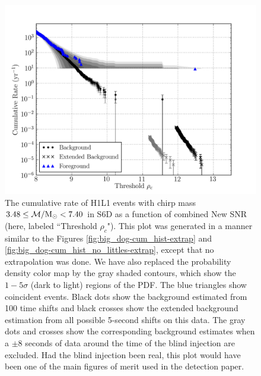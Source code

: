 \begin{figure}[p]
\center
\includegraphics[width=6in]{figures/big_dog/H1L1V1-lalapps_cbc_plotrates_FINAL_PLOT_cumulative_F1_ALL_DATA_PLOTTED_OPEN_BOX-961545543-10076544.png}
\caption{The cumulative rate of H1L1 events with chirp mass $3.48 \le \mathcal{M}/\mathrm{M_\odot}
< 7.40$ in S6D as a function of combined New SNR (here, labeled
``Threshold $\rho_c$"). This plot was generated in a manner similar to the
Figures \ref{fig:big_dog-cum_hist-extrap} and
\ref{fig:big_dog-cum_hist_no_littles-extrap}, except that no extrapolation was
done. We have also replaced the probability density color map by the gray
shaded contours, which show the $1 - 5\sigma$ (dark to light) regions of the
PDF. The blue triangles show coincident events.  Black dots show the
background estimated from 100 time shifts and black crosses show the extended
background estimation from all possible 5-second shifts on this data.  The gray
dots and crosses show the corresponding background estimates when a $\pm 8$
seconds of data around the time of the blind injection are excluded. Had the
blind injection been real, this plot would have been one of the main figures of
merit used in the detection paper.}
\label{fig:big_dog-rate_plot}
\end{figure}
